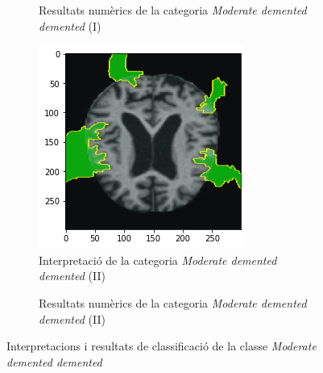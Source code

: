 \documentclass[a4paper,12pt]{article}
\begin{document}
\begin{figure}[h!]
\begin{subfigure}[b]{0.40\linewidth}
        \caption{Resultats numèrics de la categoria \textit{Moderate demented demented} (I)}
        \label{fig:ClassificacioModD1}
    \end{subfigure}
    \begin{subfigure}[b]{0.40\linewidth}
        \includegraphics[width=\linewidth]{images/Moderate 2.png}
        \caption{Interpretació de la categoria \textit{Moderate demented demented} (II)}
        \label{fig:ModD2}
    \end{subfigure}
    \begin{subfigure}[b]{0.40\linewidth}
        \caption{Resultats numèrics de la categoria \textit{Moderate demented demented} (II)}
        \label{fig:ClassificacioModD1}
    \end{subfigure}
    \caption{Interpretacions i resultats de classificació de la classe \textit{Moderate demented demented}}
    \label{fig:ModDInterpretacions}
\end{figure}
\end{document}

